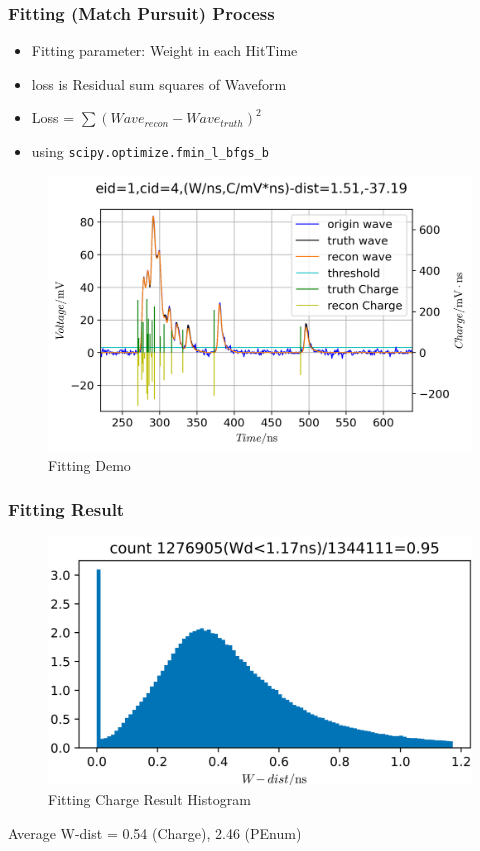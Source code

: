 \documentclass{beamer}
\begin{document}
\begin{frame}
\frametitle{Fitting (Match Pursuit) Process}
\begin{itemize}
    \item Fitting parameter: Weight in each HitTime
    \item loss is Residual sum squares of Waveform
    \item Loss = $\sum(Wave_{recon}-Wave_{truth})^{2}$
    \item using \lstinline{scipy.optimize.fmin_l_bfgs_b}
\end{itemize}
\setlength{\abovecaptionskip}{0mm}
\setlength{\belowcaptionskip}{0mm}
\begin{figure}
    \centering
    \caption{Fitting Demo}
    \includegraphics[width=0.78\linewidth]{img/demo.png}
\end{figure}
\end{frame}

\begin{frame}
\frametitle{Fitting Result}
\begin{figure}
    \centering
    \caption{Fitting Charge Result Histogram}
    \includegraphics[width=0.85\linewidth]{img/xiaopeipchargehist.png}
\end{figure}
\begin{center}
    Average W-dist = 0.54 (Charge), 2.46 (PEnum)
\end{center}
\end{frame}
\end{document}
